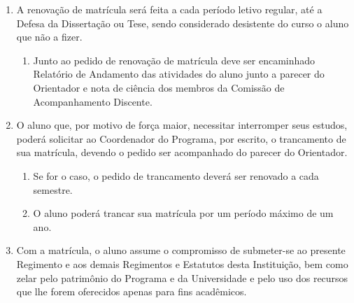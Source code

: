 \documentclass{article}
\newcommand{\singleitem}{\item[Parágrafo Único.]}
\begin{document}
\begin{enumerate}
	\item A renovação de matrícula será feita a cada período letivo regular, até a Defesa da Dissertação ou Tese, sendo considerado desistente do curso o aluno que não a fizer.
	\begin{enumerate}
		\singleitem Junto ao pedido de renovação de matrícula deve ser encaminhado Relatório de Andamento das atividades do aluno junto a parecer do Orientador e nota de ciência dos membros da Comissão de Acompanhamento Discente.
	\end{enumerate}

	\item O aluno que, por motivo de força maior, necessitar interromper seus estudos, poderá solicitar ao Coordenador do Programa, por escrito, o trancamento de sua matrícula, devendo o pedido ser acompanhado do parecer do Orientador.
	\begin{enumerate}
		\item Se for o caso, o pedido de trancamento deverá ser renovado a cada semestre.
		\item O aluno poderá trancar sua matrícula por um período máximo de um ano.
	\end{enumerate}

	\item Com a matrícula, o aluno assume o compromisso de submeter-se ao presente Regimento e aos demais Regimentos e Estatutos desta Instituição, bem como zelar pelo patrimônio do Programa e da Universidade e pelo uso dos recursos que lhe forem oferecidos apenas para fins acadêmicos.
\end{enumerate}
\end{document}
